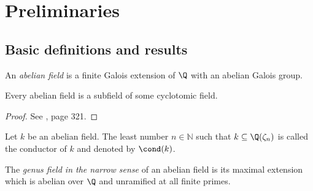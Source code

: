 \chapter{Preliminaries}
\setcounter{page}{1}

\section{Basic definitions and results}
\begin{definition}
An \textit{abelian field} is a finite Galois extension of $\Q$ with an abelian Galois group. 
\end{definition}

\begin{theorem}
Every abelian field is a subfield of some cyclotomic field.
\end{theorem}
\begin{proof}
See \citep{washington1997}, page 321.
\end{proof}

\begin{definition}
Let $k$ be an abelian field. The least number $n\in\mathbb{N}$ such that $k\subseteq \Q(\zeta_n)$ is called the conductor of $k$ and denoted by $\cond(k)$.
\end{definition}

\begin{definition}\label{genusdef}
The \textit{genus field in the narrow sense} of an abelian field is its maximal extension which is abelian over $\Q$ and unramified at all finite primes.
\end{definition}

